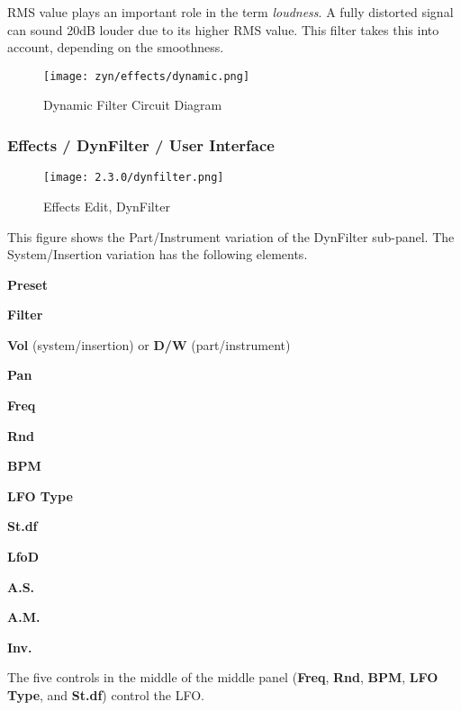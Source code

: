    RMS value plays an important role in the term \textsl{loudness}.
   A fully distorted signal can sound 20dB louder due to its higher RMS value.
   This filter takes this into account, depending on the smoothness.

\begin{figure}[H]
   \centering
   \texttt{[image: zyn/effects/dynamic.png]}
   \caption{Dynamic Filter Circuit Diagram}
   \label{fig:dynfilter_circuit_diagram}
\end{figure}

\subsubsection{Effects / DynFilter / User Interface}
\label{subsubsec:effects_edit_dynfilter_ui}

\begin{figure}[H]
   \centering
   \texttt{[image: 2.3.0/dynfilter.png]}
   \caption{Effects Edit, DynFilter}
   \label{fig:effects_edit_dynfilter}
\end{figure}

   This figure shows the Part/Instrument variation of the DynFilter sub-panel.
   The System/Insertion variation has the following elements.

   \begin{enumber}
      \item \textbf{Preset}
      \item \textbf{Filter}
      \item \textbf{Vol} (system/insertion) or \textbf{D/W} (part/instrument)
      \item \textbf{Pan}
      \item \textbf{Freq}
      \item \textbf{Rnd}
      \item \textbf{BPM}
      \item \textbf{LFO Type}
      \item \textbf{St.df}
      \item \textbf{LfoD}
      \item \textbf{A.S.}
      \item \textbf{A.M.}
      \item \textbf{Inv.}
   \end{enumber}

   The five controls in the middle of the middle panel
   (\textbf{Freq}, \textbf{Rnd}, \textbf{BPM}, \textbf{LFO Type}, and \textbf{St.df})
   control the LFO.

